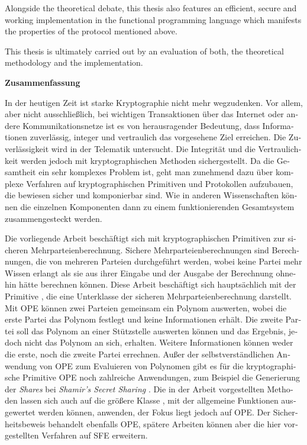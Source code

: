 Alongside the theoretical debate, this thesis also features an efficient, secure
and working implementation in the functional programming language \JWThaskell{}
which manifests the properties of the protocol mentioned above.

This thesis is ultimately carried out by an evaluation of both, the theoretical
methodology and the implementation.

\cleardoublepage

\noindent{}\textsf{\textbf{\huge Zusammenfassung}}

\bigskip{}
\begin{otherlanguage}{ngerman}

\noindent{}In der heutigen Zeit ist starke Kryptographie nicht mehr wegzudenken.
Vor allem, aber nicht ausschließlich, bei wichtigen Transaktionen über das
Internet oder andere Kommunikationsnetze ist es von herausragender Bedeutung,
dass Informationen zuverlässig, integer und vertraulich das vorgesehene Ziel
erreichen. Die Zuverlässigkeit wird in der Telematik untersucht. Die Integrität
und die Vertraulichkeit werden jedoch mit kryptographischen Methoden
sichergestellt. Da die Gesamtheit ein sehr komplexes Problem ist, geht man
zunehmend dazu über komplexe Verfahren auf kryptographischen Primitiven und
Protokollen aufzubauen, die bewiesen sicher und komponierbar sind. Wie in
anderen Wissenschaften können die einzelnen Komponenten dann zu einem
funktionierenden Gesamtsystem zusammengesteckt werden.

Die vorliegende Arbeit beschäftigt sich mit kryptographischen Primitiven zur
sicheren Mehrparteienberechnung. Sichere Mehrparteienberechnungen sind
Berechnungen, die von mehreren Parteien durchgeführt werden, wobei keine Partei
mehr Wissen erlangt als sie aus ihrer Eingabe und der Ausgabe der Berechnung
ohnehin hätte berechnen können. Diese Arbeit beschäftigt sich hauptsächlich mit
der Primitive , die eine
Unterklasse der sicheren Mehrparteienberechnung darstellt. Mit OPE können zwei
Parteien gemeinsam ein Polynom auswerten, wobei die erste Partei das Polynom
festlegt und keine Informationen erhält. Die zweite Partei soll das Polynom an
einer Stützstelle auswerten können und das Ergebnis, jedoch nicht das Polynom an
sich, erhalten. Weitere Informationen können weder die erste, noch die zweite
Partei errechnen. Außer der selbstverständlichen Anwendung von OPE zum
Evaluieren von Polynomen gibt es für die kryptographische Primitive OPE noch
zahlreiche Anwendungen, zum Beispiel die Generierung der \emph{Shares} bei
\emph{Shamir's Secret Sharing} \cite{shamir79}. Die in der Arbeit vorgestellten
Methoden lassen sich auch auf die größere Klasse , mit der allgemeine Funktionen ausgewertet werden können,
anwenden, der Fokus liegt jedoch auf OPE. Der Sicherheitsbeweis behandelt
ebenfalls OPE, spätere Arbeiten können aber die hier vorgestellten Verfahren auf
SFE erweitern.


\end{otherlanguage}
